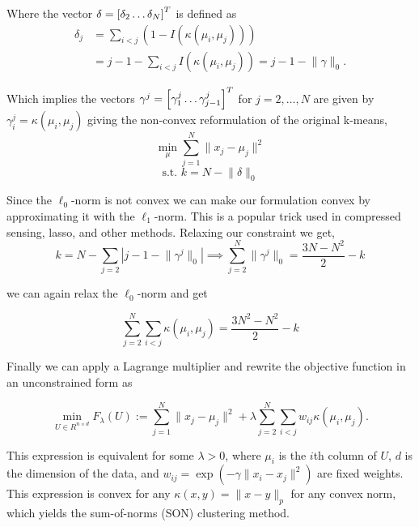 \documentclass[12pt]{beamer}
\begin{document}
\begin{frame}
	Where the vector $\delta = \left[ \delta_2 \space \dots \space \delta_N \right]^T$ is defined as
	$$
	\begin{aligned}
	\delta_j &= \sum_{i<j} \left(1 - I\left( \kappa(\mu_i,\mu_j)\right) \right) \\
		&= j - 1 - \sum_{i<j}I\left(\kappa(\mu_i,\mu_j)\right) = j - 1 - \lVert \gamma \rVert_0.
	\end{aligned}
	$$
	
	Which implies the vectors $\gamma^j = \left[ \gamma_1^j \space \dots \space \gamma_{j-1}^j \right]^T$ for $j=2,\dots,N$ are given by $\gamma_i^j = \kappa\left( \mu_i,\mu_j\right)$ giving the non-convex reformulation of the original k-means,
	$$ \min_\mu \sum_{j=1}^{N} \lVert x_j - \mu_j \rVert^2$$
	$$ \text{s.t.  } k = N - \lVert \delta \rVert_0$$

	
\end{frame}

\begin{frame}
	Since the $\ell_0$-norm is not convex we can make our formulation convex by approximating it with the $\ell_1$-norm. This is a popular trick used in compressed sensing, lasso, and other methods. Relaxing our constraint we get,
	$$
		k = N - \sum_{j=2} \left| j - 1 - \lVert \gamma^j \rVert_0 \right| \implies \sum_{j=2}^N \lVert \gamma^j \rVert_0 = \frac{3N - N^2}{2} - k
	$$
	
	we can again relax the $\ell_0$-norm and get
	
	$$ \sum_{j=2}^N \sum_{i<j} \kappa(\mu_i,\mu_j) = \frac{3N^2 - N^2}{2} - k$$
	
	
	
\end{frame}

\begin{frame}
	Finally we can apply a Lagrange multiplier and rewrite the objective function in an unconstrained form as 
	
	$$ \min_{U \in R^{n \times d}} F_\lambda(U) :=  \sum_{j=1}^N \lVert x_j - \mu_j \rVert^2 + \lambda \sum_{j=2}^N \sum_{i<j} w_{ij} \kappa(\mu_i,\mu_j).$$
	
	This expression is equivalent for some $\lambda > 0$, where $\mu_i$ is the $i$th column of $U$, $d$ is the dimension of the data, and  $w_{ij} = \exp\left(-\gamma \lVert x_i - x_j \rVert^2\right)$ are fixed weights. This expression is convex for any $\kappa(x,y) = \lVert x - y \rVert_p$ for any convex norm, which yields the sum-of-norms (SON) clustering method.
\end{frame}
\end{document}

